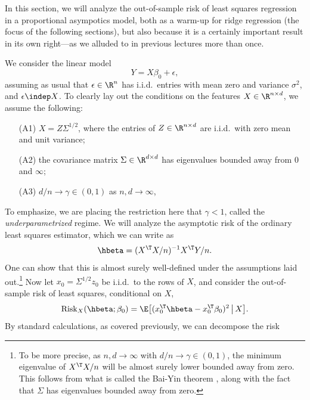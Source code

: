 \documentclass{article}
\begin{document}
\def\Risk{\mathrm{Risk}}

In this section, we will analyze the out-of-sample risk of least squares
regression in a proportional asympotics model, both as a warm-up for ridge
regression (the focus of the following sections), but also because it is a
certainly important result in its own right---as we alluded to in previous
lectures more than once. 

We consider the linear model
\begin{equation}
\label{eq:model}
Y = X\beta_0 + \epsilon,
\end{equation}
assuming as usual that $\epsilon \in \R^n$ has i.i.d.\ entries with mean zero
and variance $\sigma^2$, and $\epsilon \indep X$. To clearly lay out the
conditions on the features $X \in \R^{n \times d}$, we assume the following: 
\begin{itemize}
\item[(A1)] $X = Z \Sigma^{1/2}$, where the entries of $Z \in \R^{n \times d}$
  are i.i.d.\ with zero mean and unit variance;
\item[(A2)] the covariance matrix $\Sigma \in \R^{d \times d}$ has eigenvalues
  bounded away from $0$ and $\infty$;  
\item[(A3)] $d/n \to \gamma \in (0,1)$ as $n,d \to \infty$,
\end{itemize}
To emphasize, we are placing the restriction here that $\gamma < 1$, called the
\emph{underparametrized} regime. We will analyze the asymptotic risk of the
ordinary least squares estimator, which we can write as 
\begin{equation}
\label{eq:ls_rescaled}
\hbeta = (X^\T X/n)^{-1} X^\T Y/n.
\end{equation}
One can show that this is almost surely well-defined under the assumptions laid
out.\footnote{To be more precise, as $n,d \to \infty$ with $d/n \to \gamma \in
  (0,1)$, the minimum eigenvalue of $X^\T X/n$ will be almost surely lower
  bounded away from zero. This follows from what is called the Bai-Yin theorem 
  \citep{bai1993limit}, along with the fact that $\Sigma$ has eigenvalues
  bounded away from zero.}  
Now let $x_0 = \Sigma^{1/2} z_0$ be i.i.d.\ to the rows of $X$, and consider the
out-of-sample risk of least squares, conditional on $X$,
\begin{equation}
\label{eq:risk}
\Risk_X(\hbeta; \beta_0) = \E \big[ ( x_0^\T \hbeta - x_0^\T \beta_0 )^2
\,\big|\, X \big].
\end{equation}
By standard calculations, as covered previously, we can decompose the risk
\end{document}
